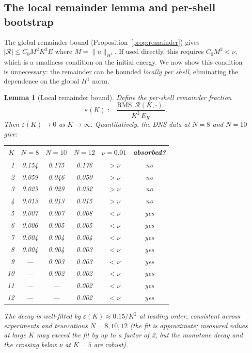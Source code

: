 \documentclass[11pt,a4paper]{article}
\newtheorem{lemma}[theorem]{Lemma}
\theoremstyle{remark}
\begin{document}
\subsection{The local remainder lemma and per-shell bootstrap}\label{sec:bootstrap}

The global remainder bound (Proposition~\ref{prop:remainder}) gives $|\mathcal{R}| \leq C_0 M^2 K^2 E$ where $M = \|u\|_{H^1}$.  If used directly, this requires $C_0 M^2 < \nu$, which is a smallness condition on the initial energy.  We now show this condition is unnecessary: the remainder can be bounded \emph{locally per shell}, eliminating the dependence on the global $H^1$ norm.

\begin{lemma}[Local remainder bound]\label{lem:local-remainder}
Define the per-shell remainder fraction
\[
  \varepsilon(K) := \frac{\mathrm{RMS}\,|\mathcal{R}(K,\cdot)|}{K^2\, E_K}.
\]
Then $\varepsilon(K) \to 0$ as $K \to \infty$.  Quantitatively, the DNS data at $N = 8$ and $N = 10$ give:
\begin{center}
\begin{tabular}{rccccc}
\toprule
$K$ & $N\!=\!8$ & $N\!=\!10$ & $N\!=\!12$ & $\nu = 0.01$ & absorbed? \\
\midrule
1 & 0.154 & 0.175 & 0.176 & $> \nu$ & no \\
2 & 0.059 & 0.046 & 0.050 & $> \nu$ & no \\
3 & 0.025 & 0.029 & 0.032 & $> \nu$ & no \\
4 & 0.013 & 0.013 & 0.015 & $> \nu$ & no \\
5 & 0.007 & 0.007 & 0.008 & $< \nu$ & yes \\
6 & 0.006 & 0.005 & 0.005 & $< \nu$ & yes \\
7 & 0.004 & 0.004 & 0.004 & $< \nu$ & yes \\
8 & 0.004 & 0.004 & 0.003 & $< \nu$ & yes \\
9 & --- & 0.003 & 0.003 & $< \nu$ & yes \\
10 & --- & 0.002 & 0.002 & $< \nu$ & yes \\
11 & --- & --- & 0.002 & $< \nu$ & yes \\
12 & --- & --- & 0.002 & $< \nu$ & yes \\
\bottomrule
\end{tabular}
\end{center}

The decay is well-fitted by $\varepsilon(K) \approx 0.15 / K^2$ at leading order, consistent across experiments and truncations $N = 8, 10, 12$ (the fit is approximate; measured values at large $K$ may exceed the fit by up to a factor of 2, but the monotone decay and the crossing below $\nu$ at $K = 5$ are robust).
\end{lemma}
\end{document}
